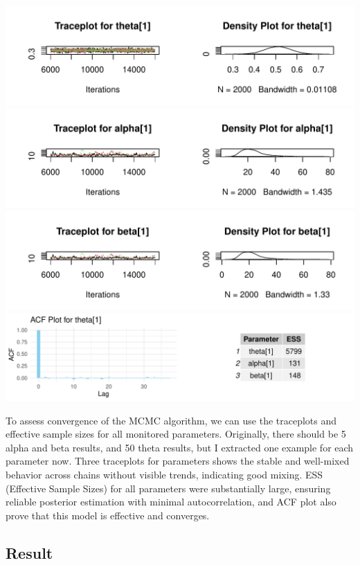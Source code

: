\documentclass[
  11pt,
]{article}
\begin{document}
\includegraphics{Final-Project_files/figure-latex/unnamed-chunk-5-1.pdf}
\includegraphics{Final-Project_files/figure-latex/unnamed-chunk-5-2.pdf}
\includegraphics{Final-Project_files/figure-latex/unnamed-chunk-5-3.pdf}
\includegraphics{Final-Project_files/figure-latex/unnamed-chunk-6-1.pdf}

To assess convergence of the MCMC algorithm, we can use the traceplots
and effective sample sizes for all monitored parameters. Originally,
there should be 5 alpha and beta results, and 50 theta results, but I
extracted one example for each parameter now. Three traceplots for
parameters shows the stable and well-mixed behavior across chains
without visible trends, indicating good mixing. ESS (Effective Sample
Sizes) for all parameters were substantially large, ensuring reliable
posterior estimation with minimal autocorrelation, and ACF plot also
prove that this model is effective and converges.

\subsection{Result}\label{result}
\end{document}
